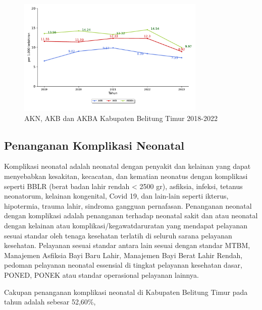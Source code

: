 \begin{figure}[H]
    \centering{}
    \includegraphics[width=0.8\textwidth]{bab_05/bab_05_11a_plotNeoBayiBalita}
    \caption{AKN, AKB dan AKBA Kabupaten Belitung Timur 2018-2022}
    \label{fig:AKN-AKB-AKBA-2018-2022}
\end{figure}

\subsection{Penanganan Komplikasi Neonatal}
Komplikasi neonatal adalah neonatal dengan penyakit dan kelainan yang
dapat menyebabkan kesakitan, kecacatan, dan kematian neonatus dengan
komplikasi seperti BBLR (berat badan lahir rendah < 2500 gr), asfiksia, infeksi, tetanus neonatorum, kelainan kongenital, Covid 19, dan lain-lain
seperti ikterus, hipotermia, trauma lahir, sindroma gangguan pernafasan. Penanganan neonatal dengan komplikasi adalah
penanganan terhadap neonatal sakit dan atau neonatal dengan kelainan
atau komplikasi/kegawatdaruratan yang mendapat pelayanan sesuai standar
oleh tenaga kesehatan terlatih di seluruh sarana pelayanan kesehatan.
Pelayanan sesuai standar antara lain sesuai dengan standar MTBM, Manajemen
Asfiksia Bayi Baru Lahir, Manajemen Bayi Berat Lahir Rendah, pedoman
pelayanan neonatal essensial di tingkat pelayanan kesehatan dasar,
PONED, PONEK atau standar operasional pelayanan lainnya.

Cakupan penanganan komplikasi neonatal di Kabupaten Belitung Timur
pada tahun \tP adalah sebesar 52,60\%, %

